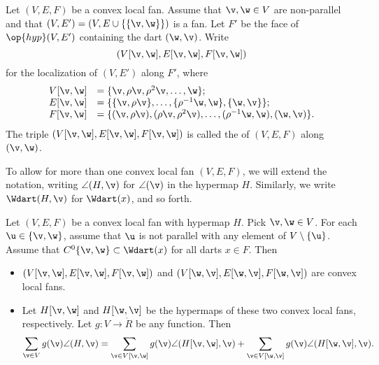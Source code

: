 \begin{definition}[slice]
 Let $(V,E,F)$ be a convex local fan.  Assume that
$\v,\w\in V$ are non-parallel and that $(V,E')=(V,E\cup
\{\{\v,\w\}\})$ is a fan.  Let $F'$ be the face of $\op{hyp}(V,E')$
containing the dart $(\w,\v)$.  Write
\begin{displaymath}(V[\v,\w],E[\v,\w],F[\v,\w])\end{displaymath}
for the localization of $(V,E')$ along $F'$, where
\begin{displaymath}
\begin{array}{lll}
  V[\v,\w] &= \{\v,\rho \v,\rho^2 \v,\ldots,\w\};\\
  E[\v,\w] &= \{\{\v,\rho \v\},\ldots,\{\rho^{-1}\w,\w\},\{\w,\v\}\};\\
  F[\v,\w] &= \{(\v,\rho \v),(\rho \v,\rho^2 \v),
 \ldots,(\rho^{-1}\w,\w),(\w,\v)\}.
\end{array}
\end{displaymath}
The triple $(V[\v,\w],E[\v,\w],F[\v,\w])$ is called the
 of $(V,E,F)$ along $(\v,\w)$.
\end{definition}
%

To allow for more than one convex local fan $(V,E,F)$, we will extend
the notation, writing $\angle(H,\v)$ for $\angle(\v)$ in the hypermap
$H$.  Similarly, we write $\Wdart(H,\v)$ for $\Wdart(x)$, and so
forth.  %
%


\begin{lemma}[slicing]\label{lemma:slice} Let
$(V,E,F)$ be a convex local fan with hypermap $H$.  Pick $\v,\w\in V$. For
each $\u\in \{\v,\w\}$, assume that $\u$ is not parallel with  any
element of $V\setminus\{\u\}$.  Assume that $C^0\{\v,\w\}\subset
\Wdart(x)$ for all darts $x\in F$.  Then
\begin{itemize}
\item $(V[\v,\w],E[\v,\w],F[\v,\w])$ and
$(V[\w,\v],E[\w,\v],F[\w,\v])$ are convex local fans.
\item Let $H[\v,\w]$ and $H[\w,\v]$ be the hypermaps of these two
  convex local fans, respectively.  Let $g:V\to\ring{R}$ be any
  function.  Then
\begin{displaymath}
  \sum_{\v\in V} g(\v)\angle(H,\v) 
  = \sum_{\v\in V[\v,\w]}g(\v)\angle(H[\v,\w],\v) 
  + \sum_{\v\in V[\w,\v]}g(\v)\angle(H[\w,\v],\v).
\end{displaymath}
\end{itemize}
\end{lemma}
%
%

